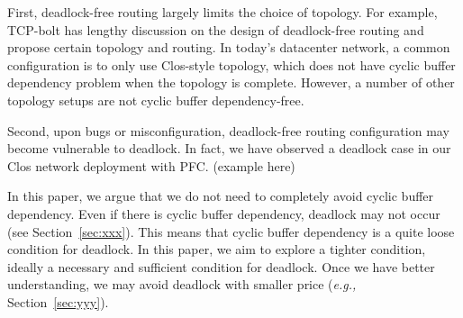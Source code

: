First, deadlock-free routing largely limits the choice of topology. For example, TCP-bolt 
has lengthy discussion on the design of deadlock-free routing and propose certain topology and routing. 
In today's datacenter network, a common configuration is to only use Clos-style topology, which does 
not have cyclic buffer dependency problem when the topology is complete. However, a number
of other topology setups are not cyclic buffer dependency-free.

Second, upon bugs or misconfiguration, deadlock-free routing configuration may become
vulnerable to deadlock. In fact, we have observed a deadlock case in our Clos network
deployment with PFC. (example here)


In this paper, we argue that we do not need to completely avoid cyclic buffer dependency.
Even if there is cyclic buffer dependency, deadlock may not occur (see Section~\ref{sec:xxx}).
This means that cyclic buffer dependency is a quite loose condition for deadlock.
In this paper, we aim to explore a tighter condition, ideally a necessary and sufficient condition for deadlock.
Once we have better understanding, we may avoid deadlock with smaller price ({\em e.g.,} 
Section~\ref{sec:yyy}).


